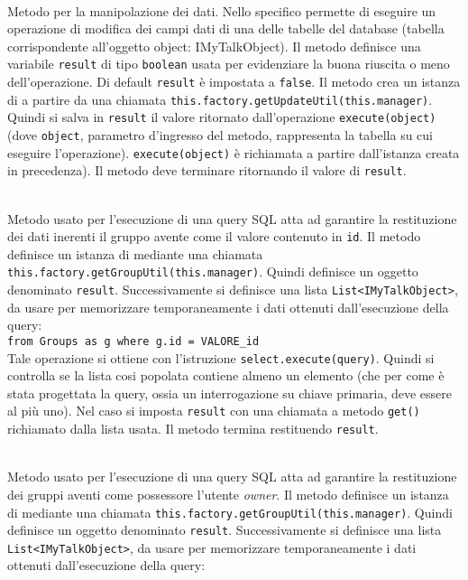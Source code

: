 \begin{description}
	\item{}\\
	Metodo per la manipolazione dei dati. Nello specifico permette di eseguire un operazione di modifica dei campi dati di una delle tabelle del database (tabella corrispondente all'oggetto object: IMyTalkObject). Il metodo definisce una variabile \texttt{result} di tipo \texttt{boolean} usata per evidenziare la buona riuscita o meno dell'operazione. Di default \texttt{result} è impostata a \texttt{false}. Il metodo crea un istanza di  a partire da una chiamata \verb|this.factory.getUpdateUtil(this.manager)|. Quindi si salva in \texttt{result} il valore ritornato dall'operazione \verb|execute(object)| (dove \texttt{object}, parametro d'ingresso del metodo, rappresenta la tabella su cui eseguire l'operazione). \verb|execute(object)| è richiamata a partire dall'istanza  creata in precedenza). Il metodo deve terminare ritornando il valore di \texttt{result}.
	
	\item{}\\
	Metodo usato per l'esecuzione di una query SQL atta ad garantire la restituzione dei dati inerenti il gruppo avente come  il valore contenuto in \texttt{id}. Il metodo definisce un istanza di  mediante una chiamata \verb|this.factory.getGroupUtil(this.manager)|. Quindi definisce un oggetto  denominato \texttt{result}. Successivamente si definisce una lista \texttt{List<IMyTalkObject>}, da usare per memorizzare temporaneamente i dati ottenuti dall'esecuzione della query:\\
	
	\verb|from Groups as g where g.id = VALORE_id|\\
	
	Tale operazione si ottiene con l'istruzione \verb|select.execute(query)|. Quindi si controlla se la lista cosi popolata contiene almeno un elemento (che per come è stata progettata la query, ossia un interrogazione su chiave primaria, deve essere al più uno). Nel caso si imposta \texttt{result} con una chiamata a metodo \texttt{get()} richiamato dalla lista usata. Il metodo termina restituendo \texttt{result}.
	
		\item{}\\
	Metodo usato per l'esecuzione di una query SQL atta ad garantire la restituzione dei gruppi aventi come possessore l'utente \textit{owner}. Il metodo definisce un istanza di  mediante una chiamata \verb|this.factory.getGroupUtil(this.manager)|. Quindi definisce un oggetto  denominato \texttt{result}. Successivamente si definisce una lista \texttt{List<IMyTalkObject>}, da usare per memorizzare temporaneamente i dati ottenuti dall'esecuzione della query:\\
	

\end{description}
